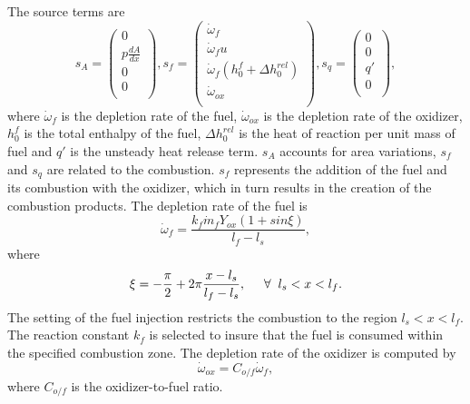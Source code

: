 The source terms are
\begin{equation} \label{p4.eq:5p2.3}
s_A = \left( \begin{gathered}
0  \\
p \frac{dA}{dx}  \\
0  \\
0 \\
\end{gathered} \right), 
s_f = \left( \begin{gathered}
{\dot \omega}_f  \\
{\dot \omega}_f u  \\
{\dot \omega}_f \left(h_{0}^{f} + \Delta h_{0}^{rel} \right)  \\
{\dot \omega}_{ox} \\
\end{gathered} \right), 
{s_q} = \left( \begin{gathered}
0  \\
0  \\
q'  \\
0 \\
\end{gathered} \right),
\end{equation}
where $\dot{\omega}_f$ is the depletion rate of the fuel, $\dot{\omega}_{ox}$ is the depletion rate of the oxidizer, $h_0^f$ is the total enthalpy of the fuel, $\Delta h_{0}^{rel}$ is the heat of reaction per unit mass of fuel and $q'$ is the unsteady heat release term. $s_A$ accounts for area variations, $s_f$ and $s_q$ are related to the combustion. $s_f$ represents the addition of the fuel and its combustion with the oxidizer, which in turn results in the creation of the combustion products. The depletion rate of the fuel is
\begin{equation}\label{p4.eq:5p2.4}
\dot{\omega}_{f}= \frac{k_f \dot{m}_f Y_{ox} \left(1+sin\xi\right)}{l_f-l_s},
\end{equation} 
where
\begin{equation}\label{p4.eq:5p2.5}
\xi= -\frac{\pi}{2} + 2\pi\frac{x-l_s}{l_f-l_s}, \hspace{0.5cm} \forall \hspace{0.2cm} l_s < x < l_f.
\end{equation}
The setting of the fuel injection restricts the combustion to the region $l_s < x < l_f$. The reaction constant $k_f$ is selected to insure that the fuel is consumed within the specified combustion zone. The depletion rate of the oxidizer is computed by 
\begin{equation}\label{p4.eq:5p2.6}
\dot{\omega}_{ox} = C_{o/f} \dot{\omega}_f,
\end{equation}
where $C_{o/f}$ is the oxidizer-to-fuel ratio.

